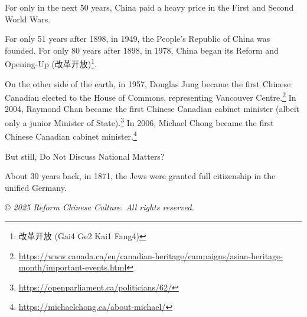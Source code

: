 \documentclass[8pt]{article}
\begin{document}
For only in the next 50 years, China paid a heavy price in the First and Second World Wars.

For only 51 years after 1898, in 1949, the People's Republic of China was founded. For only 80 years after 1898, in 1978, China began its Reform and Opening-Up (改革开放)\footnote{改革开放 (Gai4 Ge2 Kai1 Fang4)}.

On the other side of the earth, in 1957, Douglas Jung became the first Chinese Canadian elected to the House of Commons, representing Vancouver Centre.\footnote{\href{https://www.canada.ca/en/canadian-heritage/campaigns/asian-heritage-month/important-events.html}{https://www.canada.ca/en/canadian-heritage/campaigns/asian-heritage-month/important-events.html}} In 2004, Raymond Chan became the first Chinese Canadian cabinet minister (albeit only a junior Minister of State).\footnote{\href{https://openparliament.ca/politicians/62/}{https://openparliament.ca/politicians/62/}} In 2006, Michael Chong became the first Chinese Canadian cabinet minister.\footnote{\href{https://michaelchong.ca/about-michael/}{https://michaelchong.ca/about-michael/}}

But still, Do Not Discuss National Matters?

About 30 years back, in 1871, the Jews were granted full citizenship in the unified Germany.

\vspace{2cm}

\begin{center}
    \textit{© 2025 Reform Chinese Culture. All rights reserved.}
\end{center}
\end{document}
